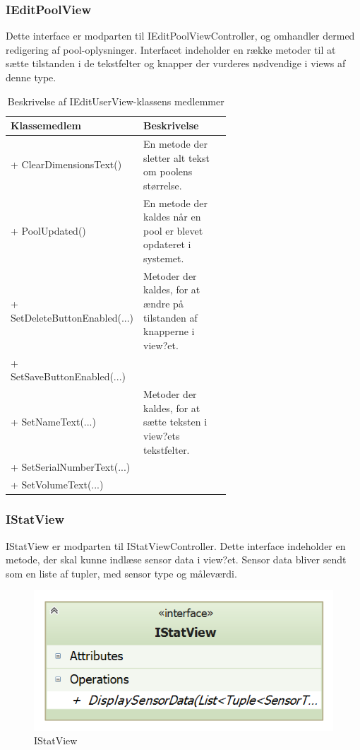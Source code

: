 \subsubsection{IEditPoolView}
Dette interface er modparten til IEditPoolViewController, og omhandler dermed redigering af pool-oplysninger. Interfacet indeholder en række metoder til at sætte tilstanden i de tekstfelter og knapper der vurderes nødvendige i views af denne type.

\begin{table}
	\centering
	\begin{tabular}{| l | p{0.62\linewidth} |}
		\toprule
		\textbf{Klassemedlem}	& \textbf{Beskrivelse} \\
		\midrule
		+ ClearDimensionsText()				 &En metode der sletter alt tekst om poolens størrelse. \\\hline
		+ PoolUpdated()					& En metode der kaldes når en pool er blevet opdateret i systemet. \\\hline
		+ SetDeleteButtonEnabled(...)				& Metoder der kaldes, for at ændre på tilstanden af knapperne i view?et. \\
		+ SetSaveButtonEnabled(...)				& \\\hline
		+ SetNameText(...)						& Metoder der kaldes, for at sætte teksten i view?ets tekstfelter.
 \\
		+ SetSerialNumberText(...)				& \\
		+ SetVolumeText(...)						& \\
		\bottomrule
		\end{tabular}
	\caption{Beskrivelse af IEditUserView-klassens medlemmer}
	\label{tab:table_design_iedituserview}	
\end{table}

\subsubsection{IStatView}
IStatView er modparten til IStatViewController. Dette interface indeholder en metode, der skal kunne indlæse sensor data i view?et. Sensor data bliver sendt som en liste af tupler, med sensor type og måleværdi.

\begin{figure}
	\centering
	\includegraphics[width=0.3\linewidth]{figs/design/application_istatview}
	\caption{IStatView}
	\label{fig:application_istatview}
\end{figure}

